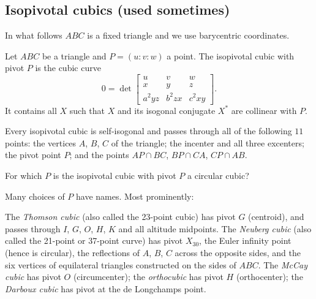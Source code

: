 \documentclass[11pt]{scrartcl}
\begin{document}
\subsection{Isopivotal cubics (used sometimes)}
In what follows $ABC$ is a fixed triangle and we use barycentric coordinates.
\begin{definition}
  Let $ABC$ be a triangle and $P = (u:v:w)$ a point.
  The \alert{isopivotal cubic} with pivot $P$ is the cubic curve
  \[ 0 = \det \begin{bmatrix} u & v & w \\
    x & y & z \\ a^2 yz & b^2 zx & c^2 xy \end{bmatrix}.  \]
  It contains all $X$ such that $X$ and its isogonal conjugate
  $X^\ast$ are collinear with $P$.
\end{definition}
\begin{proposition}
  Every isopivotal cubic is self-isogonal and passes through all of the following $11$ points:
  the vertices $A$, $B$, $C$ of the triangle;
  the incenter and all three excenters;
  the pivot point $P$;
  and the points $AP \cap BC$, $BP \cap CA$, $CP \cap AB$.
\end{proposition}
\begin{exercise}
  For which $P$ is the isopivotal cubic with pivot $P$ a circular cubic?
\end{exercise}

Many choices of $P$ have names.
Most prominently:
\begin{itemize}
\ii The \emph{Thomson cubic} (also called the 23-point cubic) has pivot $G$ (centroid),
  and passes through $I$, $G$, $O$, $H$, $K$ and all altitude midpoints.
\ii The \emph{Neuberg cubic} (also called the 21-point or 37-point curve)
  has pivot $X_{30}$, the Euler infinity point (hence is circular),
  the reflections of $A$, $B$, $C$ across the opposite sides,
  and the six vertices of equilateral triangles constructed on the sides of $ABC$.
\ii The \emph{McCay cubic} has pivot $O$ (circumcenter);
  the \emph{orthocubic} has pivot $H$ (orthocenter);
  the \emph{Darboux cubic} has pivot at the de Longchamps point.
\end{itemize}
\end{document}

